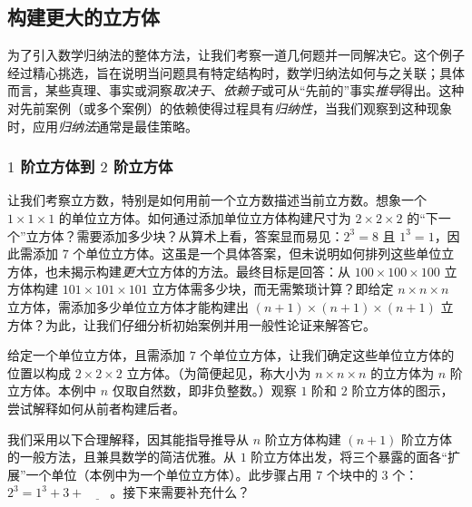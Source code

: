 \subsection{构建更大的立方体}

为了引入数学归纳法的整体方法，让我们考察一道几何题并一同解决它。这个例子经过精心挑选，旨在说明当问题具有特定结构时，数学归纳法如何与之关联；具体而言，某些真理、事实或洞察\emph{取决于}、\emph{依赖于}或可从``先前的''事实\emph{推导}得出。这种对先前案例（或多个案例）的依赖使得过程具有\emph{归纳性}，当我们观察到这种现象时，应用\emph{归纳法}通常是最佳策略。

\subsubsection*{$1$ 阶立方体到 $2$ 阶立方体}

让我们考察立方数，特别是如何用前一个立方数描述当前立方数。想象一个 $1 \times 1 \times 1$ 的单位立方体。如何通过添加单位立方体构建尺寸为 $2 \times 2 \times 2$ 的``下一个''立方体？需要添加多少块？从算术上看，答案显而易见：$2^3 = 8$ 且 $1^3 = 1$，因此需添加 $7$ 个单位立方体。这虽是一个具体答案，但未说明如何排列这些单位立方体，也未揭示构建\emph{更大}立方体的方法。最终目标是回答：从 $100 \times 100 \times 100$ 立方体构建 $101 \times 101 \times 101$ 立方体需多少块，而无需繁琐计算？即给定 $n \times n \times n$ 立方体，需添加多少单位立方体才能构建出 $(n+1) \times (n+1) \times (n+1)$ 立方体？为此，让我们仔细分析初始案例并用一般性论证来解答它。

给定一个单位立方体，且需添加 $7$ 个单位立方体，让我们确定这些单位立方体的位置以构成 $2 \times 2 \times 2$ 立方体。（为简便起见，称大小为 $n \times n \times n$ 的立方体为 $n$ 阶立方体。本例中 $n$ 仅取自然数，即非负整数。）观察 $1$ 阶和 $2$ 阶立方体的图示，尝试解释如何从前者构建后者。

\begin{center}
\end{center}

我们采用以下合理解释，因其能指导推导从 $n$ 阶立方体构建 $(n+1)$ 阶立方体的一般方法，且兼具数学的简洁优雅。从 $1$ 阶立方体出发，将三个暴露的面各``扩展''一个单位（本例中为一个单位立方体）。此步骤占用 $7$ 个块中的 $3$ 个：$2^3 = 1^3 + 3 + \underline{\qquad}$。接下来需要补充什么？

